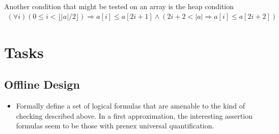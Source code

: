 \documentclass{article}
\begin{document}
Another condition that might be tested on an array is the heap condition
\begin{gather}
  \label{eq:3}
  (\forall i) (0 \le i < \lfloor|a|/2\rfloor) \Rightarrow a[i] \le a[2i+1] \wedge (2i+2
  < |a| \Rightarrow a[i] \le a[2i+2])
\end{gather}


\section{Tasks}
\label{sec:tasks}

\subsection{Offline Design}
\label{sec:offline-design}

\begin{itemize}
\item Formally define a set of logical formulas that are amenable to the kind of checking
  described above. In a first approximation, the interesting assertion formulas seem to
  be those with prenex universal quantification.


\end{itemize}
\end{document}
